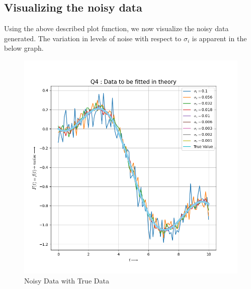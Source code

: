 \documentclass[11pt, a4paper]{article}
\begin{document}
        \subsection{Visualizing the noisy data}
             Using the above described plot function, we now visualize the noisy data generated. The variation in levels of noise with respect to $\sigma_i$ is apparent in the below graph.
            \begin{figure}[H]
                \centering
                \includegraphics[scale=0.75]{noisy_data.png}
                \caption{Noisy Data with True Data}
                \label{fig:noisyAndTrue}
            \end{figure}
            
\end{document}
